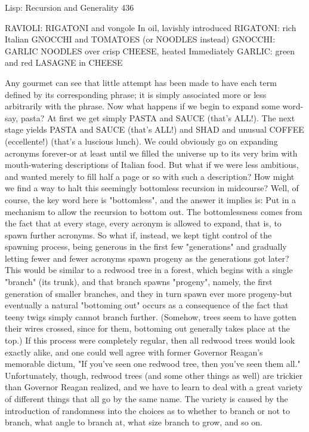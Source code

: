 Lisp: Recursion and Generality                                    436

RAVIOLI:
     RIGATONI and vongole In oil, lavishly introduced
RIGATONI:
     rich Italian GNOCCHI and TOMATOES (or NOODLES
     instead)
GNOCCHI:
     GARLIC NOODLES over crisp CHEESE, heated Immediately
GARLIC:
     green and red LASAGNE in CHEESE

Any gourmet can see that little attempt has been made to have each term defined by
its corresponding phrase; it is simply associated more or less arbitrarily with the
phrase.
         Now what happens if we begin to expand some word-say, pasta? At first we
get simply PASTA and SAUCE (that's ALL!). The next stage yields
PASTA and SAUCE (that's ALL!) and SHAD and unusual COFFEE
(eccellente!) (that's a luscious lunch). We could obviously go on expanding
acronyms forever-or at least until we filled the universe up to its very brim with
mouth-watering descriptions of Italian food. But what if we were less ambitious, and
wanted merely to fill half a page or so with such a description? How might we find a
way to halt this seemingly bottomless recursion in midcourse?
         Well, of course, the key word here is "bottomless", and the answer it implies
is: Put in a mechanism to allow the recursion to bottom out. The bottomlessness
comes from the fact that at every stage, every acronym is allowed to expand, that is,
to spawn further acronyms. So what if, instead, we kept tight control of the spawning
process, being generous in the first few "generations" and gradually letting fewer and
fewer acronyms spawn progeny as the generations got later? This would be similar to
a redwood tree in a forest, which begins with a single "branch" (its trunk), and that
branch spawns "progeny", namely, the first generation of smaller branches, and they
in turn spawn ever more progeny-but eventually a natural "bottoming out" occurs as a
consequence of the fact that teeny twigs simply cannot branch further. (Somehow,
trees seem to have gotten their wires crossed, since for them, bottoming out generally
takes place at the top.)
         If this process were completely regular, then all redwood trees would look
exactly alike, and one could well agree with former Governor Reagan's memorable
dictum, "If you've seen one redwood tree, then you've seen them all." Unfortunately,
though, redwood trees (and some other things as well) are trickier than Governor
Reagan realized, and we have to learn to deal with a great variety of different things
that all go by the same name. The variety is caused by the introduction of randomness
into the choices as to whether to branch or not to branch, what angle to branch at,
what size branch to grow, and so on.





